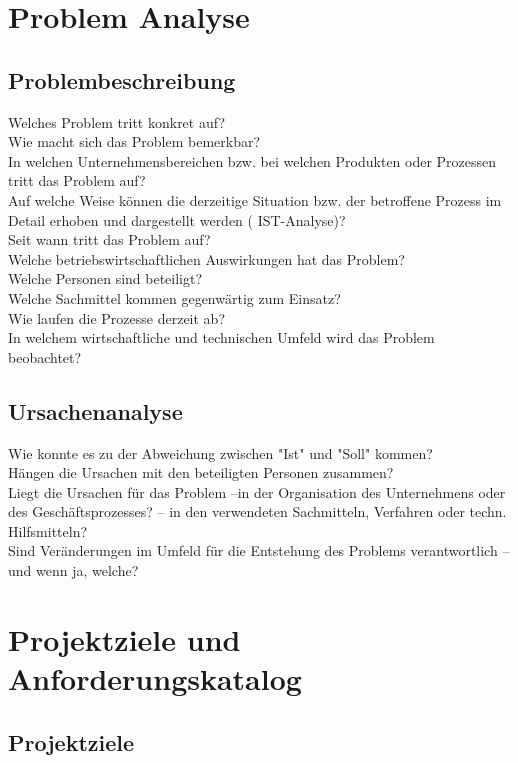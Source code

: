 \documentclass[a4paper, 12pt]{article}
\newcommand{\changefont}[3]{
\fontfamily{#1} \fontseries{#2} \fontshape{#3} \selectfont}
\begin{document}

%


	\tableofcontents
	\newpage

\section{Problem Analyse}
\subsection{Problembeschreibung}
Welches Problem tritt konkret auf? \\
Wie macht sich das Problem bemerkbar? 
\\
In welchen Unternehmensbereichen bzw. bei welchen Produkten oder Prozessen tritt das Problem auf? 
\\
Auf welche Weise können die derzeitige Situation bzw. der betroffene Prozess im Detail erhoben und dargestellt werden (
IST-Analyse)? 
\\
Seit wann tritt das Problem auf? 
\\
Welche betriebswirtschaftlichen Auswirkungen hat das Problem? 
\\
Welche Personen sind beteiligt? 
\\
Welche Sachmittel kommen gegenwärtig zum Einsatz? 
\\
Wie laufen die Prozesse derzeit ab? 
\\
In welchem wirtschaftliche und technischen Umfeld wird das Problem beobachtet?
\subsection{Ursachenanalyse}
Wie konnte es zu der Abweichung zwischen "Ist" und "Soll" kommen? 
\\
Hängen die Ursachen mit den beteiligten Personen zusammen? 
\\
Liegt die Ursachen für das Problem –in der Organisation des Unternehmens oder des Geschäftsprozesses? – in den verwendeten Sachmitteln, Verfahren oder techn. Hilfsmitteln?
\\
Sind Veränderungen im Umfeld für die Entstehung des Problems verantwortlich – und wenn ja, welche? 
\section{Projektziele und Anforderungskatalog}
\subsection{Projektziele}
\end{document}
